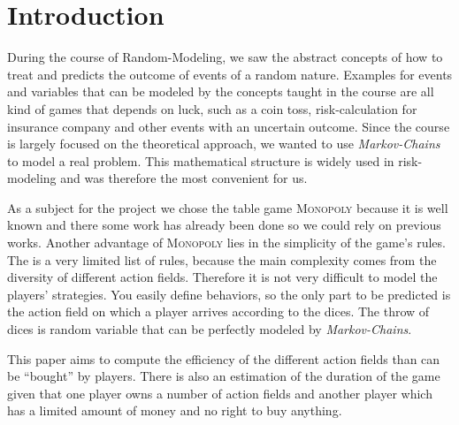 \section{Introduction} %
\label{sec:introduction}

During the course of Random-Modeling, we saw the abstract concepts of how to treat and predicts the 
outcome of events of a random nature. Examples for events and variables that can be modeled by the 
concepts taught in the course are all kind of games that depends on luck, such as a coin toss, 
risk-calculation for insurance company and other events with an uncertain outcome. Since the course
is largely focused on the theoretical approach, we wanted to use \textit{Markov-Chains} to model 
a real problem. This mathematical structure is widely used in risk-modeling and was therefore the
most convenient for us. 

As a subject for the project we chose the table game \textsc{Monopoly} because it is well known and 
there some work has already been done so we could rely on previous works. Another advantage of 
\textsc{Monopoly} lies in the simplicity of the game's rules. The is a very limited list of rules, 
because the main complexity comes from the diversity of different action fields. Therefore it is not
very difficult to model the players' strategies. You easily define behaviors, so the only part to 
be predicted is the action field on which a player arrives according to the dices. The throw of 
dices is random variable that can be perfectly modeled by \textit{Markov-Chains}.

This paper aims to compute the efficiency of the different action fields than can be ``bought'' by 
players. There is also an estimation of the duration of the game given that one player owns a number
of action fields and another player which has a limited amount of money and no right to buy anything.


